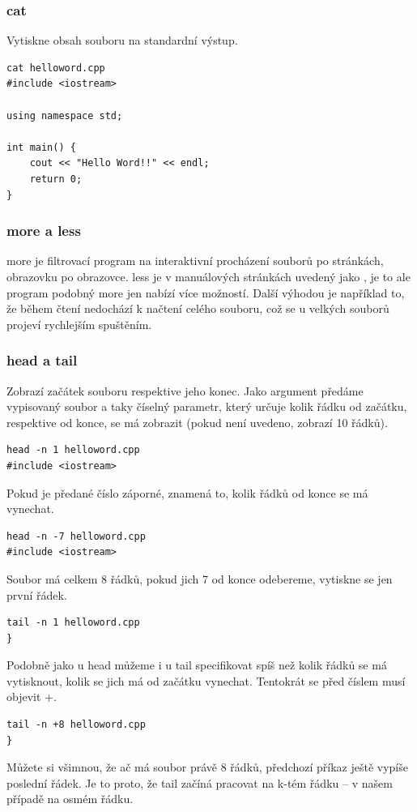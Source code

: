 \documentclass{article}
\begin{document}
\subsubsection{cat}
Vytiskne obsah souboru na standardní výstup.
\begin{verbatim}
cat helloword.cpp
#include <iostream>

using namespace std;

int main() {
	cout << "Hello Word!!" << endl;	
	return 0;	
}
\end{verbatim}

\subsubsection{more a less}
more je filtrovací program na interaktivní procházení souborů po stránkách, obrazovku po obrazovce. less je v manuálových stránkách uvedený jako , je to ale program podobný more jen nabízí více možností. Další výhodou je například to, že během čtení nedochází k načtení celého souboru, což se u velkých souborů projeví rychlejším spuštěním.

\subsubsection{head a tail}
Zobrazí začátek souboru respektive jeho konec. Jako argument předáme vypisovaný soubor a taky číselný parametr, který určuje kolik řádku od začátku, respektive od konce, se má zobrazit (pokud není uvedeno, zobrazí 10 řádků).
\begin{verbatim}
head -n 1 helloword.cpp
#include <iostream>
\end{verbatim}
Pokud je předané číslo záporné, znamená to, kolik řádků od konce se má vynechat. 
\begin{verbatim}
head -n -7 helloword.cpp
#include <iostream>
\end{verbatim}
Soubor má celkem 8 řádků, pokud jich 7 od konce odebereme, vytiskne se jen první řádek. 
\begin{verbatim}
tail -n 1 helloword.cpp
}
\end{verbatim}
Podobně jako u head můžeme i u tail specifikovat spíš než kolik řádků se má vytisknout, kolik se jich má od začátku vynechat. Tentokrát se před číslem musí objevit +.

\begin{verbatim}
tail -n +8 helloword.cpp
}
\end{verbatim}
Můžete si všimnou, že ač má soubor právě 8 řádků, předchozí příkaz ještě vypíše poslední řádek. Je to proto, že tail začíná pracovat na k-tém řádku -- v našem případě na osmém řádku.
\end{document}
